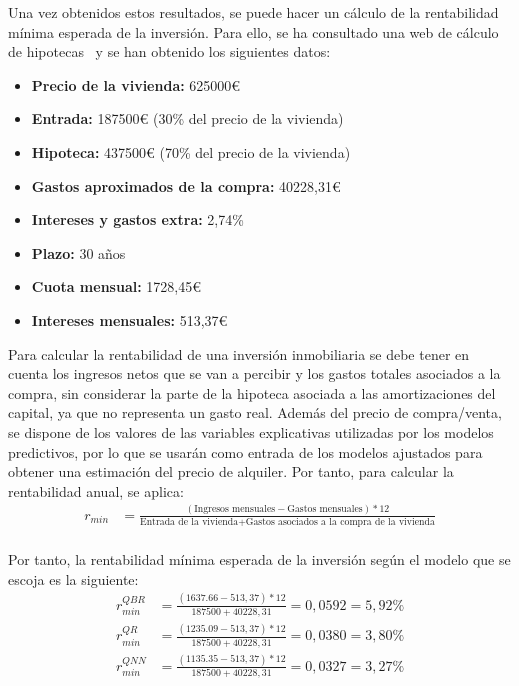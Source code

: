 \documentclass[11pt]{book}
\theoremstyle{plain} %
\theoremstyle{definition} %
\begin{document}
Una vez obtenidos estos resultados, se puede hacer un 
cálculo de la rentabilidad mínima esperada de la inversión. Para ello, se ha 
consultado una web de cálculo de hipotecas~\cite{BBVA25} y se han obtenido 
los siguientes datos:
\begin{itemize}
   \item \textbf{Precio de la vivienda:} 625000€
   \item \textbf{Entrada:} 187500€ (30\% del precio de la vivienda)
   \item \textbf{Hipoteca:} 437500€ (70\% del precio de la vivienda)
   \item \textbf{Gastos aproximados de la compra:} 40228,31€
   \item \textbf{Intereses y gastos extra:} 2,74\%
   \item \textbf{Plazo:} 30 años
   \item \textbf{Cuota mensual:} 1728,45€
   \item \textbf{Intereses mensuales:} 513,37€
\end{itemize}
Para calcular la rentabilidad de una inversión inmobiliaria se debe tener en cuenta los ingresos netos que se van a percibir y los gastos totales asociados a la compra, sin considerar la parte de la hipoteca asociada a las amortizaciones del capital, ya que no representa un gasto real. Además del precio de compra/venta, se dispone de los valores de las variables explicativas utilizadas por los modelos predictivos, por lo que se usarán como entrada de los modelos ajustados para obtener una estimación del precio de alquiler. Por tanto, para calcular la rentabilidad anual, se aplica:
\begin{align*}
   r_{min} &= \frac{(\text{Ingresos mensuales}-\text{Gastos mensuales})*12}{\text{Entrada de la vivienda}+\text{Gastos asociados a la compra de la vivienda}} \\
\end{align*}

Por tanto, la rentabilidad mínima esperada de la inversión según el modelo 
que se escoja es la siguiente:
\begin{align*}
   r_{min}^{QBR} &= \frac{(1637.66 - 513,37)*12}{187500+40228,31} = 0,0592 = 5,92\% \\
   r_{min}^{QR} &= \frac{(1235.09 - 513,37)*12}{187500+40228,31} = 0,0380 = 3,80 \% \\
   r_{min}^{QNN} &= \frac{(1135.35 - 513,37)*12}{187500+40228,31} = 0,0327 = 3,27\% \\
\end{align*}
\end{document}
